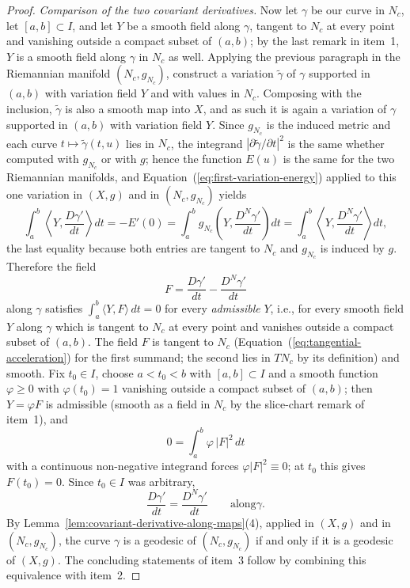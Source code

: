 \begin{proof}
\emph{Comparison of the two covariant derivatives.} Now let $\gamma$ be
our curve in $N_c$, let $[a,b]\subset I$, and let $Y$ be a smooth field
along $\gamma$, tangent to $N_c$ at every point and vanishing outside a
compact subset of $(a,b)$; by the last remark in item~1, $Y$ is a
smooth field along $\gamma$ in $N_c$ as well. Applying the previous
paragraph in the Riemannian manifold $(N_c,g_{N_c})$, construct a
variation $\tilde\gamma$ of $\gamma$ supported in $(a,b)$ with
variation field $Y$ and with values in $N_c$. Composing with the
inclusion, $\tilde\gamma$ is also a smooth map into $X$, and as such it
is again a variation of $\gamma$ supported in $(a,b)$ with variation
field $Y$. Since $g_{N_c}$ is the induced metric and each curve
$t\mapsto\tilde\gamma(t,u)$ lies in $N_c$, the integrand
$\left|\partial\tilde\gamma/\partial t\right|^2$ is the same whether
computed with $g_{N_c}$ or with $g$; hence the function $E(u)$ is the
same for the two Riemannian manifolds, and
Equation~(\ref{eq:first-variation-energy}) applied to this one
variation in $(X,g)$ and in $(N_c,g_{N_c})$ yields
$$\int_a^b\left\langle Y,\frac{D\gamma'}{dt}\right\rangle dt
=-E'(0)
=\int_a^bg_{N_c}\left(Y,\frac{D^N\gamma'}{dt}\right)dt
=\int_a^b\left\langle Y,\frac{D^N\gamma'}{dt}\right\rangle dt,$$
the last equality because both entries are tangent to $N_c$ and
$g_{N_c}$ is induced by $g$. Therefore the field
$$F=\frac{D\gamma'}{dt}-\frac{D^N\gamma'}{dt}$$
along $\gamma$ satisfies $\int_a^b\langle Y,F\rangle\,dt=0$ for every
{\em admissible} $Y$, i.e., for every smooth field $Y$ along $\gamma$
which is tangent to $N_c$ at every point and vanishes outside a compact
subset of $(a,b)$. The field $F$ is tangent to $N_c$
(Equation~(\ref{eq:tangential-acceleration}) for the first summand; the
second lies in $TN_c$ by its definition) and smooth. Fix $t_0\in I$,
choose $a<t_0<b$ with $[a,b]\subset I$ and a smooth function
$\varphi\ge0$ with $\varphi(t_0)=1$ vanishing outside a compact subset
of $(a,b)$; then $Y=\varphi F$ is admissible (smooth as a field in
$N_c$ by the slice-chart remark of item~1), and
$$0=\int_a^b\varphi\,|F|^2\,dt$$
with a continuous non-negative integrand forces $\varphi|F|^2\equiv0$;
at $t_0$ this gives $F(t_0)=0$. Since $t_0\in I$ was arbitrary,
$$\frac{D\gamma'}{dt}=\frac{D^N\gamma'}{dt}\qquad\text{along
}\gamma .$$
By Lemma~\ref{lem:covariant-derivative-along-maps}(4), applied in
$(X,g)$ and in $(N_c,g_{N_c})$, the curve $\gamma$ is a geodesic of
$(N_c,g_{N_c})$ if and only if it is a geodesic of $(X,g)$. The
concluding statements of item~3 follow by combining this equivalence
with item~2.
\end{proof}

